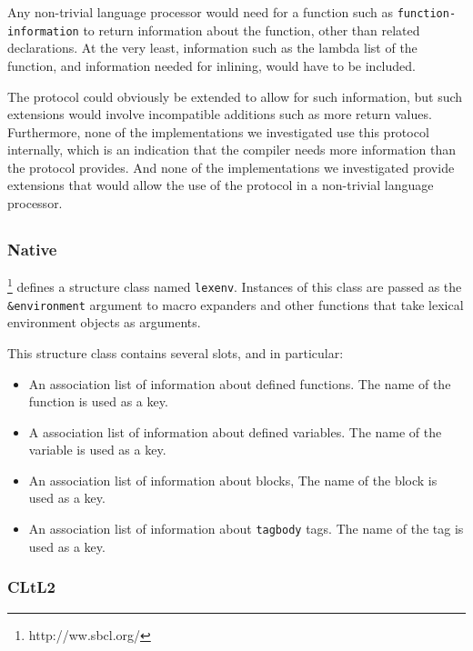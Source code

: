 Any non-trivial language processor would need for a function such as
\texttt{function-information} to return information about the
function, other than related declarations.  At the very least,
information such as the lambda list of the function, and information
needed for inlining, would have to be included.

The protocol could obviously be extended to allow for such
information, but such extensions would involve incompatible additions
such as more return values.  Furthermore, none of the \commonlisp{}
implementations we investigated use this protocol internally, which is
an indication that the compiler needs more information than the
protocol provides.  And none of the implementations we investigated
provide extensions that would allow the use of the protocol in
a non-trivial language processor.

\subsection{\sbcl{}}

\subsubsection{Native}

\sbcl{}%
\footnote{http://ww.sbcl.org/}
defines a structure class named \texttt{lexenv}.  Instances of
this class are passed as the \texttt{\&environment} argument to macro
expanders and other functions that take lexical environment objects as
arguments.

This structure class contains several slots, and in particular:
\begin{itemize}
\item An association list of information about defined functions.
  The name of the function is used as a key.
\item A association list of information about defined variables.
  The name of the variable is used as a key.
\item An association list of information about blocks,
  The name of the block is used as a key.
\item An association list of information about \texttt{tagbody} tags.
  The name of the tag is used as a key.
\end{itemize}

\subsubsection{CLtL2}

